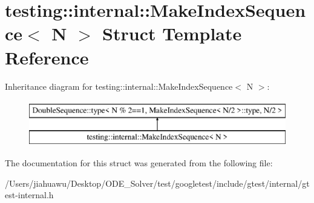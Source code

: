 \hypertarget{structtesting_1_1internal_1_1_make_index_sequence}{}\section{testing\+:\+:internal\+:\+:Make\+Index\+Sequence$<$ N $>$ Struct Template Reference}
\label{structtesting_1_1internal_1_1_make_index_sequence}
Inheritance diagram for testing\+:\+:internal\+:\+:Make\+Index\+Sequence$<$ N $>$\+:\begin{figure}[H]
\begin{center}
\leavevmode
\includegraphics[height=2.000000cm]{structtesting_1_1internal_1_1_make_index_sequence}
\end{center}
\end{figure}


The documentation for this struct was generated from the following file\+:\begin{DoxyCompactItemize}
\item 
/\+Users/jiahuawu/\+Desktop/\+O\+D\+E\+\_\+\+Solver/test/googletest/include/gtest/internal/gtest-\/internal.\+h\end{DoxyCompactItemize}
